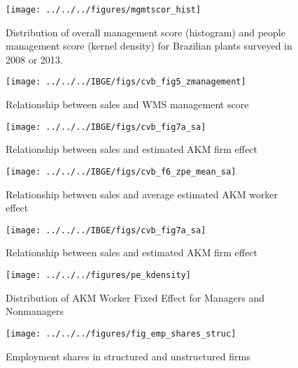 \clearpage

\clearpage
\begin{figure}
    \texttt{[image: ../../../figures/mgmtscor\_hist]}
    \caption{Distribution of overall management score (histogram) and people management score (kernel density) for Brazilian plants surveyed in 2008 or 2013.}
    \label{fig:pe_kdensity}
\end{figure}

\clearpage


\clearpage
\begin{figure}
    \texttt{[image: ../../../IBGE/figs/cvb\_fig5\_zmanagement]}
    \caption{Relationship between sales and WMS management score}
    \label{fig:sales_v_mgmt}
\end{figure}

\clearpage
\begin{figure}
    \texttt{[image: ../../../IBGE/figs/cvb\_fig7a\_sa]}
    \caption{Relationship between sales and estimated AKM firm effect}
    \label{fig:sales_v_fe}
\end{figure}

\clearpage
\begin{figure}
    \texttt{[image: ../../../IBGE/figs/cvb\_f6\_zpe\_mean\_sa]}
    \caption{Relationship between sales and average estimated AKM worker effect}
    \label{fig:sales_v_pe}
\end{figure}

\clearpage
\begin{figure}
    \texttt{[image: ../../../IBGE/figs/cvb\_fig7a\_sa]}
    \caption{Relationship between sales and estimated AKM firm effect}
    \label{fig:sales_v_fe}
\end{figure}


\clearpage

\clearpage


\clearpage
\begin{figure}
    \texttt{[image: ../../../figures/pe\_kdensity]}
    \caption{Distribution of AKM Worker Fixed Effect for Managers and Nonmanagers}
    \label{fig:pe_kdensity}
\end{figure}

\begin{figure}
    \texttt{[image: ../../../figures/fig\_emp\_shares\_struc]}
    \caption{Employment shares in structured and unstructured firms}
    \label{fig:emp_shares}
\end{figure}



